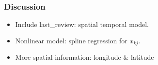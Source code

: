 \documentclass{beamer}
\begin{document}
\begin{frame}
\frametitle{Discussion}
\begin{itemize}
	\item Include last\_review: spatial temporal model.
	\item Nonlinear model: spline regression for $x_{kj}$.
	\item More spatial information: longitude \& latitude
\end{itemize}
	
\end{frame}
\end{document}
